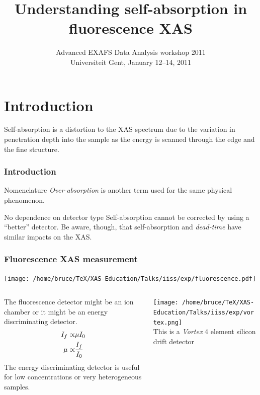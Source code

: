\documentclass[10pt, xcolor=x11names, compress]{beamer}
\title{Understanding self-absorption in fluorescence XAS}
\date[NSLS2010]{Advanced EXAFS Data Analysis workshop 2011\\
  Universiteit Gent, January 12--14, 2011}
\begin{document}
\maketitle


\section[Introduction]{Introduction}
\begin{frame}
  
  Self-absorption is a distortion to the XAS spectrum due to the
  variation in penetration depth into the sample as the energy is
  scanned through the edge and the fine structure.

  \frametitle{Introduction}
  \begin{block}{Nomenclature}
    \textit{Over-absorption} is another term used for the same physical
    phenomenon.
  \end{block}

  \begin{block}{No dependence on detector type}
    Self-absorption cannot be corrected by using a ``better''
    detector.  Be aware, though, that self-absorption and
    \textit{dead-time} have similar impacts on the XAS.
  \end{block}
\end{frame}

\begin{frame}
  \frametitle{Fluorescence XAS measurement}

  \begin{center}
\texttt{[image: /home/bruce/TeX/XAS-Education/Talks/iiss/exp/fluorescence.pdf]}%
  \end{center}
  \begin{columns}[T]
    \begin{column}{0.5\linewidth}
      The fluorescence detector might be an ion
      chamber or it might be an energy discriminating detector. %
      {\small
        \begin{align}
          I_f \propto& \mu I_0 \notag\\
          \mu \propto& \frac{I_f}{I_0} \notag
        \end{align}
      }%
      The energy discriminating detector is useful for low
      concentrations or very heterogeneous samples.
    \end{column}
    \begin{column}{0.5\linewidth}
      \begin{overlayarea}{\linewidth}{5in}
        \quad\texttt{[image: /home/bruce/TeX/XAS-Education/Talks/iiss/exp/vortex.png]}~
          \\[2ex]This is a \textit{Vortex} 4 element silicon drift detector
      \end{overlayarea}
    \end{column}
  \end{columns}

\end{frame}
\end{document}
